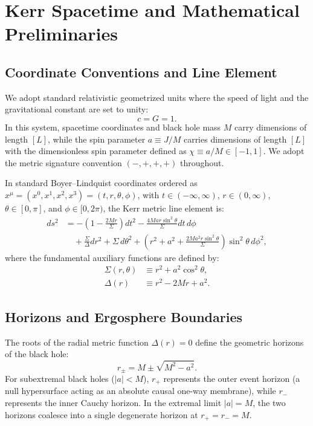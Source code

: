 \section{Kerr Spacetime and Mathematical Preliminaries}
\label{sec:kerr_spacetime}

\subsection{Coordinate Conventions and Line Element}
We adopt standard relativistic geometrized units where the speed of light and the gravitational constant are set to unity:
\begin{equation}
    c = G = 1.
\end{equation}
In this system, spacetime coordinates and black hole mass $M$ carry dimensions of length $[L]$, while the spin parameter $a \equiv J/M$ carries dimensions of length $[L]$ with the dimensionless spin parameter defined as $\chi \equiv a/M \in [-1, 1]$. We adopt the metric signature convention $(-, +, +, +)$ throughout.

In standard Boyer--Lindquist coordinates \cite{BoyerLindquist1967,MisnerThorneWheeler1973} ordered as $x^\mu = (x^0, x^1, x^2, x^3) = (t, r, \theta, \phi)$, with $t \in (-\infty, \infty)$, $r \in (0, \infty)$, $\theta \in [0, \pi]$, and $\phi \in [0, 2\pi)$, the Kerr metric line element is:
\begin{align}
    ds^2 &= -\left(1 - \frac{2Mr}{\Sigma}\right) dt^2 - \frac{4Mar\sin^2\theta}{\Sigma} dt\,d\phi \nonumber \\
    &\quad + \frac{\Sigma}{\Delta} dr^2 + \Sigma\,d\theta^2 + \left(r^2 + a^2 + \frac{2Ma^2r\sin^2\theta}{\Sigma}\right)\sin^2\theta\,d\phi^2,
    \label{eq:kerr_line_element}
\end{align}
where the fundamental auxiliary functions are defined by:
\begin{align}
    \Sigma(r, \theta) &\equiv r^2 + a^2\cos^2\theta, \label{eq:def_sigma} \\
    \Delta(r) &\equiv r^2 - 2Mr + a^2. \label{eq:def_delta}
\end{align}

\subsection{Horizons and Ergosphere Boundaries}
The roots of the radial metric function $\Delta(r) = 0$ define the geometric horizons of the black hole:
\begin{equation}
    r_\pm = M \pm \sqrt{M^2 - a^2}.
    \label{eq:horizon_radii}
\end{equation}
For subextremal black holes ($|a| < M$), $r_+$ represents the outer event horizon (a null hypersurface acting as an absolute causal one-way membrane), while $r_-$ represents the inner Cauchy horizon. In the extremal limit $|a| = M$, the two horizons coalesce into a single degenerate horizon at $r_+ = r_- = M$.

